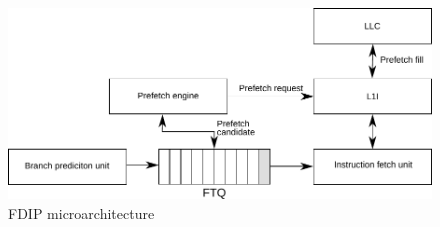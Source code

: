\begin{figure}
\centering
\includegraphics[width=.9\columnwidth, trim=0 0 0 0, clip]{figures/fdip1.pdf}
\caption{FDIP microarchitecture}
\vspace{-0.1in}
\label{cal:fig:fdip}
\end{figure}